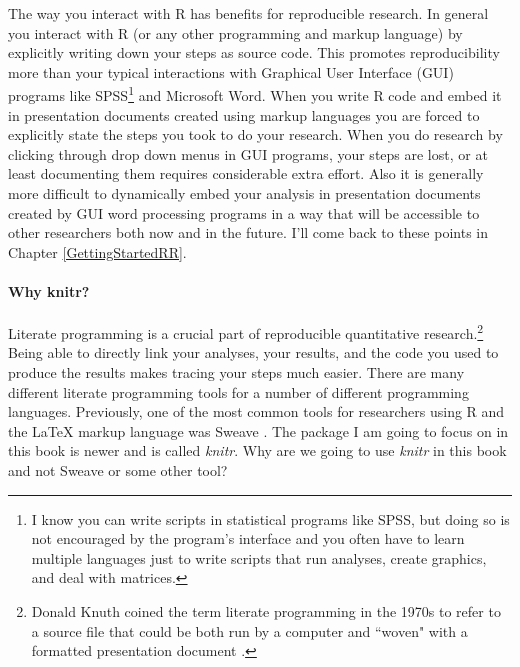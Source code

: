 The way you interact with R has benefits for reproducible research. In general you interact with R (or any other programming and markup language) by explicitly writing down your steps as source code. This promotes reproducibility more than your typical interactions with Graphical User Interface (GUI) programs like SPSS\footnote{I know you can write scripts in statistical programs like SPSS, but doing so is not encouraged by the program's interface and you often have to learn multiple languages just to write scripts that run analyses, create graphics, and deal with matrices.} and Microsoft Word. When you write R code and embed it in presentation documents created using markup languages you are forced to explicitly state the steps you took to do your research. When you do research by clicking through drop down menus in GUI programs, your steps are lost, or at least documenting them requires considerable extra effort. Also it is generally more difficult to dynamically embed your analysis in presentation documents created by GUI word processing programs in a way that will be accessible to other researchers both now and in the future. I'll come back to these points in Chapter \ref{GettingStartedRR}.

\paragraph{Why knitr?}

Literate programming is a crucial part of reproducible quantitative research.\footnote{Donald Knuth coined the term literate programming in the 1970s to refer to a source file that could be both run by a computer and ``woven" with a formatted presentation document \cite[]{Knuth1992}.} Being able to directly link your analyses, your results, and the code you used to produce the results makes tracing your steps much easier. There are many different literate programming tools for a number of different programming languages. Previously, one of the most common tools for researchers using R and the LaTeX markup language was Sweave \cite[]{Leisch2002}. The package I am going to focus on in this book is newer and is called {\emph{knitr}}. Why are we going to use {\emph{knitr}} in this book and not Sweave or some other tool?

